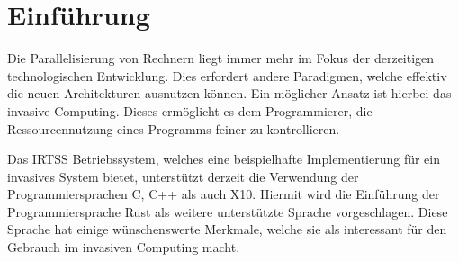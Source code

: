 \chapter{Einführung}\label{sec:intro}

Die Parallelisierung von Rechnern liegt immer mehr im Fokus der derzeitigen
technologischen Entwicklung. Dies erfordert andere Paradigmen, welche effektiv
die neuen Architekturen ausnutzen können. Ein möglicher Ansatz ist hierbei das
invasive Computing. Dieses ermöglicht es dem Programmierer, die Ressourcennutzung
eines Programms feiner zu kontrollieren.

Das IRTSS Betriebssystem, welches eine beispielhafte Implementierung für ein
invasives System bietet, unterstützt derzeit die Verwendung der Programmiersprachen
C, C++ als auch X10. Hiermit wird die Einführung der Programmiersprache Rust als
weitere unterstützte Sprache vorgeschlagen. Diese Sprache hat einige
wünschenswerte Merkmale, welche sie als interessant für den Gebrauch im
invasiven Computing macht.
